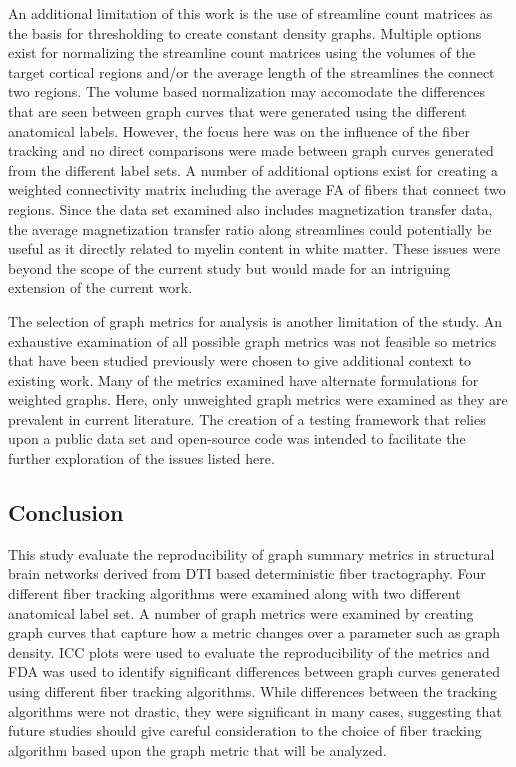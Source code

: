 \documentclass{frontiersSCNS} %
\begin{document}
An additional limitation of this work is the use of streamline count matrices as the basis for thresholding to create constant
density graphs. Multiple options exist for normalizing the streamline count matrices using the volumes of 
the target cortical regions and/or the average length of the streamlines the connect two regions. The volume based
normalization may accomodate the differences that are seen between graph curves that were generated using 
the different anatomical labels. However, the focus here was on the influence of the fiber tracking and no direct
comparisons were made between graph curves generated from the different label sets. A number of additional options
exist for creating a weighted connectivity matrix including the average FA of fibers that connect two regions. Since the data set
examined also includes magnetization transfer data, the average magnetization transfer ratio along streamlines 
could potentially be useful as it directly related to myelin content in white matter. These issues were beyond the scope 
of the current study but would made for an intriguing extension of the current work. 

The selection of graph metrics for analysis is another limitation of the study. An exhaustive examination of all
possible graph metrics was not feasible so metrics that have been studied previously were chosen to give additional
context to existing work. Many of the metrics examined have alternate formulations for 
weighted graphs. Here, only unweighted graph metrics were examined as they are prevalent in current literature.
 The creation of a testing framework that relies upon a public data set and open-source code
was intended to facilitate the further exploration of the issues listed here.

\subsection{Conclusion}
This study evaluate the reproducibility of graph summary metrics in structural brain networks derived from
DTI based deterministic fiber tractography. Four different fiber tracking algorithms were examined along
with two different anatomical label set. A number of graph metrics were examined by creating graph curves that capture how a metric
changes over a parameter such as graph density. ICC plots were used to evaluate the reproducibility of the metrics and FDA
was used to identify significant differences between graph curves generated using different fiber tracking algorithms.
While differences between the tracking algorithms were not drastic, they were significant in many cases, suggesting
that future studies should give careful consideration to the choice of fiber tracking algorithm based upon the graph
metric that will be analyzed. 
\end{document}
